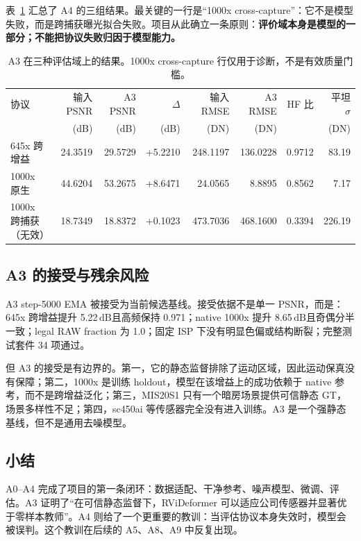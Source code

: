 \documentclass[11pt,a4paper,UTF8,fontset=fandol]{ctexart}
\newcommand{\db}{\ensuremath{\,\mathrm{dB}}}
\begin{document}
表~\ref{tab:a4} 汇总了 A4 的三组结果。最关键的一行是“1000x cross-capture”：它不是模型失败，而是跨捕获曝光拟合失败。项目从此确立一条原则：\textbf{评价域本身是模型的一部分；不能把协议失败归因于模型能力。}

\begin{table}[H]
\centering
\small
\caption{A3 在三种评估域上的结果。1000x cross-capture 行仅用于诊断，不是有效质量门槛。}
\label{tab:a4}
\begin{tabular}{lrrrrrrr}
\toprule
协议 & 输入 PSNR & A3 PSNR & $\Delta$ & 输入 RMSE & A3 RMSE & HF 比 & 平坦 $\sigma$ \\
 & (dB) & (dB) & (dB) & (DN) & (DN) & & (DN) \\
\midrule
645x 跨增益 & 24.3519 & 29.5729 & +5.2210 & 248.1197 & 136.0228 & 0.9712 & 83.19 \\
1000x 原生 & 44.6204 & 53.2675 & +8.6471 & 24.0565 & 8.8895 & 0.8562 & 7.17 \\
1000x 跨捕获（无效） & 18.7349 & 18.8372 & +0.1023 & 473.7036 & 468.1600 & 0.3394 & 226.19 \\
\bottomrule
\end{tabular}
\end{table}

\subsection{A3 的接受与残余风险}

A3 step-5000 EMA 被接受为当前候选基线。接受依据不是单一 PSNR，而是：645x 跨增益提升 5.22\db 且高频保持 0.971；native 1000x 提升 8.65\db 且奇偶分半一致；legal RAW fraction 为 1.0；固定 ISP 下没有明显色偏或结构断裂；完整测试套件 34 项通过。

但 A3 的接受是有边界的。第一，它的静态监督排除了运动区域，因此运动保真没有保障；第二，1000x 是训练 holdout，模型在该增益上的成功依赖于 native 参考，而不是跨增益泛化；第三，MIS20S1 只有一个暗房场景提供可信静态 GT，场景多样性不足；第四，sc450ai 等传感器完全没有进入训练。A3 是一个强静态基线，但不是通用去噪模型。

\subsection{小结}

A0--A4 完成了项目的第一条闭环：数据适配、干净参考、噪声模型、微调、评估。A3 证明了“在可信静态监督下，RViDeformer 可以适应公司传感器并显著优于零样本教师”。A4 则给了一个更重要的教训：当评估协议本身失效时，模型会被误判。这个教训在后续的 A5、A8、A9 中反复出现。
\end{document}
